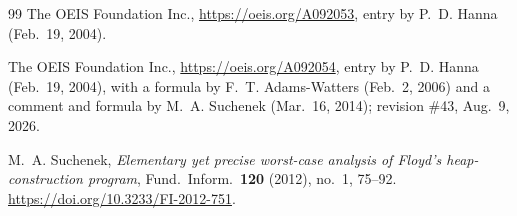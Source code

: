 \documentclass[11pt]{amsart}
\theoremstyle{plain}
\theoremstyle{definition}
\begin{document}
\begin{thebibliography}{99}
The OEIS Foundation Inc., \url{https://oeis.org/A092053}, entry by P.~D. Hanna (Feb.~19, 2004).

The OEIS Foundation Inc., \url{https://oeis.org/A092054}, entry by P.~D. Hanna (Feb.~19, 2004), with a formula by F.~T. Adams-Watters (Feb.~2, 2006) and a comment and formula by M.~A. Suchenek (Mar.~16, 2014); revision \#43, Aug.~9, 2026.

M.~A. Suchenek, \emph{Elementary yet precise worst-case analysis of Floyd's heap-construction program}, Fund.\ Inform.\ \textbf{120} (2012), no.~1, 75--92. \url{https://doi.org/10.3233/FI-2012-751}.

\end{thebibliography}
\end{document}
